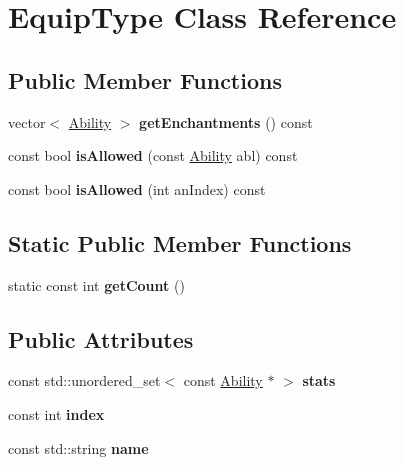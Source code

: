 \hypertarget{class_equip_type}{}\section{Equip\+Type Class Reference}
\label{class_equip_type}
\subsection*{Public Member Functions}
\begin{DoxyCompactItemize}
\item 
\hypertarget{class_equip_type_a05327988569e884c73fe56aecfb5c31e}{}\label{class_equip_type_a05327988569e884c73fe56aecfb5c31e} 
vector$<$ \hyperlink{class_ability}{Ability} $>$ {\bfseries get\+Enchantments} () const
\item 
\hypertarget{class_equip_type_adc5b044a73400362f38078e25b242272}{}\label{class_equip_type_adc5b044a73400362f38078e25b242272} 
const bool {\bfseries is\+Allowed} (const \hyperlink{class_ability}{Ability} abl) const
\item 
\hypertarget{class_equip_type_a1cf5a5d3ab3ff6bd9da46061073e23ec}{}\label{class_equip_type_a1cf5a5d3ab3ff6bd9da46061073e23ec} 
const bool {\bfseries is\+Allowed} (int an\+Index) const
\end{DoxyCompactItemize}
\subsection*{Static Public Member Functions}
\begin{DoxyCompactItemize}
\item 
\hypertarget{class_equip_type_abb382741bb477afd8ee58971dbbde300}{}\label{class_equip_type_abb382741bb477afd8ee58971dbbde300} 
static const int {\bfseries get\+Count} ()
\end{DoxyCompactItemize}
\subsection*{Public Attributes}
\begin{DoxyCompactItemize}
\item 
\hypertarget{class_equip_type_a62ce6b1e8a21549560eb00ae4cf70e3d}{}\label{class_equip_type_a62ce6b1e8a21549560eb00ae4cf70e3d} 
const std\+::unordered\+\_\+set$<$ const \hyperlink{class_ability}{Ability} $\ast$ $>$ {\bfseries stats}
\item 
\hypertarget{class_equip_type_a7f5c248cfd8972043915fab139c49309}{}\label{class_equip_type_a7f5c248cfd8972043915fab139c49309} 
const int {\bfseries index}
\item 
\hypertarget{class_equip_type_a1b05978633df80f88bf0a6b1497308d4}{}\label{class_equip_type_a1b05978633df80f88bf0a6b1497308d4} 
const std\+::string {\bfseries name}
\end{DoxyCompactItemize}

